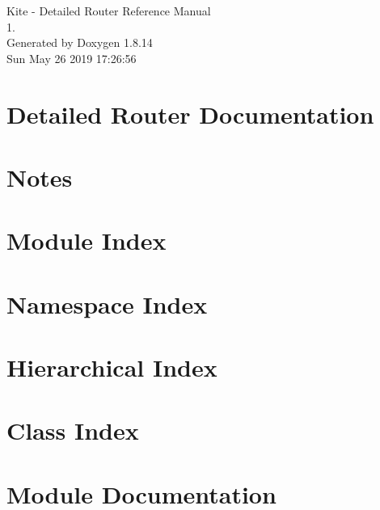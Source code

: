 \documentclass[a4paper]{asimbook}
\begin{document}
   \begin{titlepage}
     \vspace*{7cm}
     \begin{center}
     {\Large Kite -\/ Detailed Router Reference Manual\\[1ex]\large 1. }\\
     \vspace*{1cm}
     {\large Generated by Doxygen 1.8.14}\\
     \vspace*{0.5cm}
     {\small Sun May 26 2019 17:26:56}\\
     \end{center}
   \end{titlepage}

   \clearemptydoublepage

   \tableofcontents
   \clearemptydoublepage

\section{Detailed Router Documentation}
\label{index}\hypertarget{index}{}
\section{Notes}
\label{pageNotes}

\section{Module Index}

\section{Namespace Index}

\section{Hierarchical Index}

\section{Class Index}

\section{Module Documentation}


\end{document}
